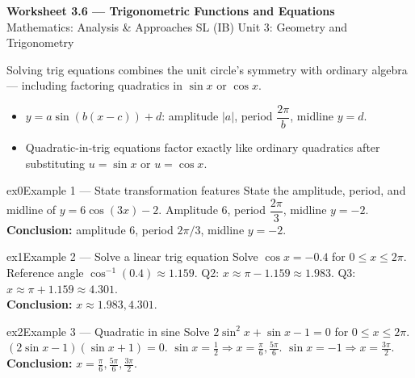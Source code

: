\documentclass[11pt]{article}
\begin{document}
\begin{center}
{\LARGE\bfseries\color{titleblue}Worksheet 3.6 --- Trigonometric Functions and Equations}\\[2pt]
{\small Mathematics: Analysis \& Approaches SL (IB) \textperiodcentered{} Unit 3: Geometry and Trigonometry}
\end{center}

\begin{ideabox}
Solving trig equations combines the unit circle's symmetry with ordinary algebra --- including factoring quadratics in $\sin x$ or $\cos x$.
\begin{itemize}[leftmargin=*,itemsep=2pt]
  \item $y=a\sin(b(x-c))+d$: amplitude $|a|$, period $\dfrac{2\pi}{b}$, midline $y=d$.
  \item Quadratic-in-trig equations factor exactly like ordinary quadratics after substituting $u=\sin x$ or $u=\cos x$.
\end{itemize}
\end{ideabox}


\begin{example}{ex0}{Example 1 --- State transformation features}
State the amplitude, period, and midline of $y=6\cos(3x)-2$.\soln
Amplitude 6, period $\dfrac{2\pi}{3}$, midline $y=-2$.\\[3pt]\textbf{Conclusion:} amplitude 6, period $2\pi/3$, midline $y=-2$.
\end{example}

\begin{example}{ex1}{Example 2 --- Solve a linear trig equation}
Solve $\cos x=-0.4$ for $0\leq x\leq2\pi$.\soln
Reference angle $\cos^{-1}(0.4)\approx1.159$. Q2: $x\approx\pi-1.159\approx1.983$. Q3: $x\approx\pi+1.159\approx4.301$.\\[3pt]\textbf{Conclusion:} $x\approx1.983,4.301$.
\end{example}

\begin{example}{ex2}{Example 3 --- Quadratic in sine}
Solve $2\sin^2x+\sin x-1=0$ for $0\leq x\leq2\pi$.\soln
$(2\sin x-1)(\sin x+1)=0$. $\sin x=\tfrac12\Rightarrow x=\tfrac{\pi}6,\tfrac{5\pi}6$. $\sin x=-1\Rightarrow x=\tfrac{3\pi}2$.\\[3pt]\textbf{Conclusion:} $x=\tfrac{\pi}6,\tfrac{5\pi}6,\tfrac{3\pi}2$.
\end{example}
\end{document}
